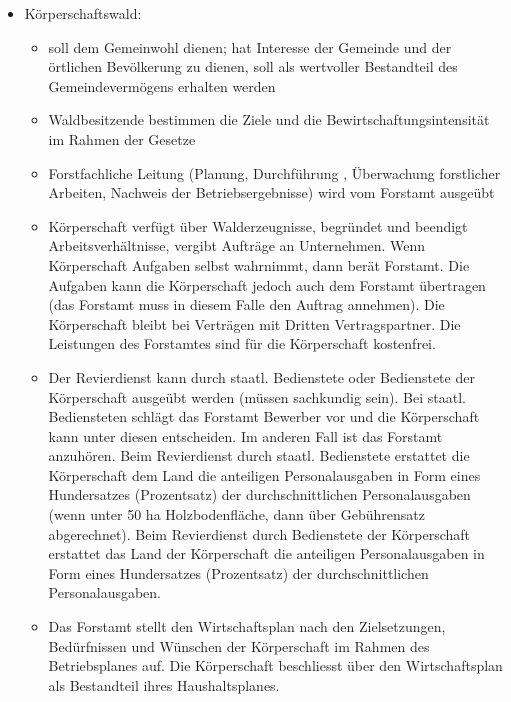 \documentclass{article}
\begin{document}
\begin{itemize}
\begin{itemize}
      \end{itemize}


   \item Körperschaftswald: 

	 \begin{itemize} 
		
		\item soll dem Gemeinwohl dienen; hat Interesse der Gemeinde und der örtlichen Bevölkerung zu dienen, soll als wertvoller Bestandteil des Gemeindevermögens erhalten werden
		
		\item Waldbesitzende bestimmen die Ziele und die Bewirtschaftungsintensität im Rahmen der Gesetze
		
		\item Forstfachliche Leitung (Planung, Durchführung , Überwachung forstlicher Arbeiten, Nachweis der Betriebsergebnisse) wird vom Forstamt ausgeübt
		
		\item Körperschaft verfügt über Walderzeugnisse, begründet und beendigt Arbeitsverhältnisse, vergibt Aufträge an Unternehmen. Wenn Körperschaft Aufgaben selbst wahrnimmt, dann berät Forstamt. Die Aufgaben kann die Körperschaft jedoch auch dem Forstamt übertragen (das Forstamt muss in diesem Falle den Auftrag annehmen). Die Körperschaft bleibt bei Verträgen mit Dritten Vertragspartner. Die Leistungen des Forstamtes sind für die Körperschaft kostenfrei.
		
		\item Der Revierdienst kann durch staatl. Bedienstete oder Bedienstete der Körperschaft ausgeübt werden (müssen sachkundig sein). Bei staatl. Bediensteten schlägt das Forstamt Bewerber vor und die Körperschaft kann unter diesen entscheiden. Im anderen Fall ist das Forstamt anzuhören. Beim Revierdienst durch staatl. Bedienstete erstattet die Körperschaft dem Land die anteiligen Personalausgaben in Form eines Hundersatzes (Prozentsatz) der durchschnittlichen Personalausgaben (wenn unter 50 ha Holzbodenfläche, dann über Gebührensatz abgerechnet). Beim Revierdienst durch Bedienstete der Körperschaft erstattet das Land der Körperschaft die anteiligen Personalausgaben in Form eines Hundersatzes (Prozentsatz) der durchschnittlichen Personalausgaben.
		
		\item Das Forstamt stellt den Wirtschaftsplan nach den Zielsetzungen, Bedürfnissen und Wünschen der Körperschaft im Rahmen des Betriebsplanes auf. Die Körperschaft beschliesst über den Wirtschaftsplan als Bestandteil ihres Haushaltsplanes.
		

\end{itemize}
\end{itemize}
\end{document}
